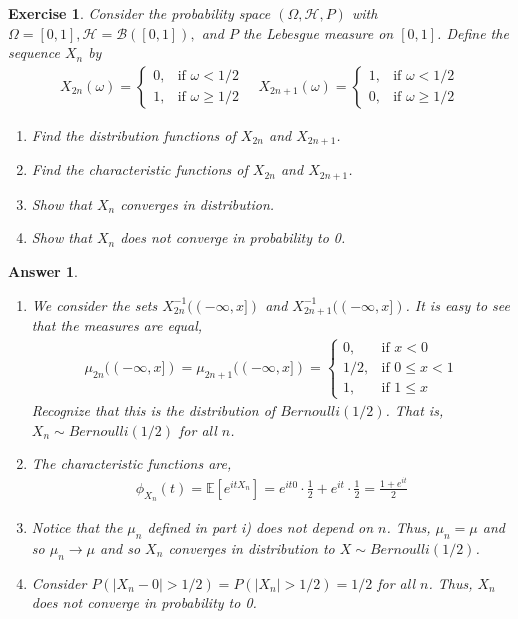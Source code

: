 \documentclass[12pt]{article}
\theoremstyle{colon}
\newtheorem{exercise}{Exercise}
\newtheorem*{answer}{Answer}
\begin{document}
\begin{exercise}
  Consider the probability space $(\Omega, \mathcal{H}, P)$ with $\Omega = [0,1], \mathcal{H} = \mathcal{B}([0,1]),$ and $P$ the Lebesgue measure on $[0,1]$. Define the sequence $X_n$ by
  \begin{gather*}
    X_{2n}(\omega) = \begin{cases}
      0, & \text{if } \omega < 1/2 \\
      1, & \text{if } \omega \geq 1/2
    \end{cases} \quad X_{2n+1}(\omega) = \begin{cases}
      1, & \text{if } \omega < 1/2 \\
      0, & \text{if } \omega \geq 1/2
    \end{cases}
  \end{gather*}
  \begin{enumerate}[label=\roman*)]
    \item Find the distribution functions of $X_{2n}$ and $X_{2n+1}$.
    \item Find the characteristic functions of $X_{2n}$ and $X_{2n+1}$.
    \item Show that $X_n$ converges in distribution.
    \item Show that $X_n$ does not converge in probability to 0.
  \end{enumerate}
\end{exercise}

\begin{answer}
  \leavevmode
  \begin{enumerate}[label=\roman*)]
    \item We consider the sets $X_{2n}^{-1}((-\infty,x])$ and $X_{2n+1}^{-1}((-\infty,x])$. It is easy to see that the measures are equal,
      \begin{gather*}
        \mu_{2n}((-\infty,x]) = \mu_{2n+1}((-\infty,x]) = \begin{cases}
          0 , & \text{if } x < 0 \\
          1/2, & \text{if } 0 \leq x < 1 \\
          1, & \text{if } 1 \leq x
        \end{cases}
      \end{gather*}
      Recognize that this is the distribution of $Bernoulli(1/2)$. That is, $X_n \sim Bernoulli(1/2)$ for all $n$.
    \item The characteristic functions are,
      \begin{gather*}
        \phi_{X_{n}}(t) = \mathbb{E}[e^{itX_n}] = e^{it0} \cdot \frac{1}{2} + e^{it} \cdot \frac{1}{2} = \frac{1 + e^{it}}{2}
      \end{gather*}
    \item Notice that the $\mu_n$ defined in part i) does not depend on $n$. Thus, $\mu_n = \mu$ and so $\mu_n \rightarrow \mu$ and so $X_n$ converges in distribution to $X \sim Bernoulli(1/2)$.
    \item Consider $P(\lvert X_n - 0 \rvert > 1/2) = P(\lvert X_n \rvert > 1/2) = 1/2$ for all $n$. Thus, $X_n$ does not converge in probability to 0.
  \end{enumerate}
\end{answer}
\end{document}
